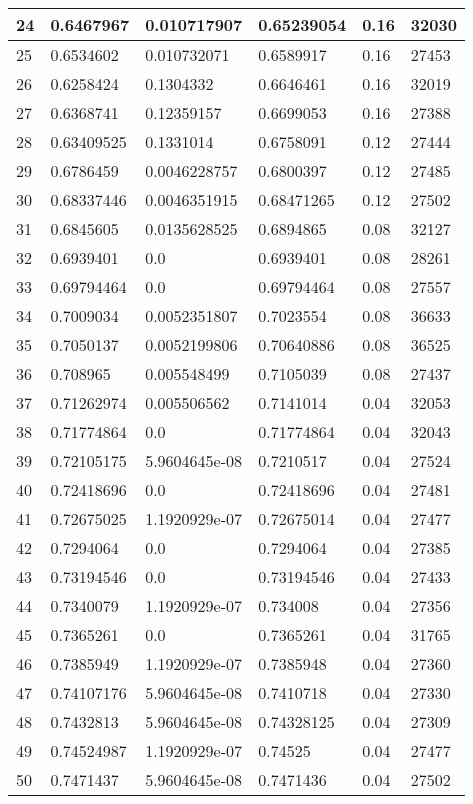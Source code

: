 \begin{longtable}{|l|l|l|l|l|l|}
24 & 0.6467967 & 0.010717907 & 0.65239054 & 0.16 & 32030 \\ \hline 
25 & 0.6534602 & 0.010732071 & 0.6589917 & 0.16 & 27453 \\ \hline 
26 & 0.6258424 & 0.1304332 & 0.6646461 & 0.16 & 32019 \\ \hline 
27 & 0.6368741 & 0.12359157 & 0.6699053 & 0.16 & 27388 \\ \hline 
28 & 0.63409525 & 0.1331014 & 0.6758091 & 0.12 & 27444 \\ \hline 
29 & 0.6786459 & 0.0046228757 & 0.6800397 & 0.12 & 27485 \\ \hline 
30 & 0.68337446 & 0.0046351915 & 0.68471265 & 0.12 & 27502 \\ \hline 
31 & 0.6845605 & 0.0135628525 & 0.6894865 & 0.08 & 32127 \\ \hline 
32 & 0.6939401 & 0.0 & 0.6939401 & 0.08 & 28261 \\ \hline 
33 & 0.69794464 & 0.0 & 0.69794464 & 0.08 & 27557 \\ \hline 
34 & 0.7009034 & 0.0052351807 & 0.7023554 & 0.08 & 36633 \\ \hline 
35 & 0.7050137 & 0.0052199806 & 0.70640886 & 0.08 & 36525 \\ \hline 
36 & 0.708965 & 0.005548499 & 0.7105039 & 0.08 & 27437 \\ \hline 
37 & 0.71262974 & 0.005506562 & 0.7141014 & 0.04 & 32053 \\ \hline 
38 & 0.71774864 & 0.0 & 0.71774864 & 0.04 & 32043 \\ \hline 
39 & 0.72105175 & 5.9604645e-08 & 0.7210517 & 0.04 & 27524 \\ \hline 
40 & 0.72418696 & 0.0 & 0.72418696 & 0.04 & 27481 \\ \hline 
41 & 0.72675025 & 1.1920929e-07 & 0.72675014 & 0.04 & 27477 \\ \hline 
42 & 0.7294064 & 0.0 & 0.7294064 & 0.04 & 27385 \\ \hline 
43 & 0.73194546 & 0.0 & 0.73194546 & 0.04 & 27433 \\ \hline 
44 & 0.7340079 & 1.1920929e-07 & 0.734008 & 0.04 & 27356 \\ \hline 
45 & 0.7365261 & 0.0 & 0.7365261 & 0.04 & 31765 \\ \hline 
46 & 0.7385949 & 1.1920929e-07 & 0.7385948 & 0.04 & 27360 \\ \hline 
47 & 0.74107176 & 5.9604645e-08 & 0.7410718 & 0.04 & 27330 \\ \hline 
48 & 0.7432813 & 5.9604645e-08 & 0.74328125 & 0.04 & 27309 \\ \hline 
49 & 0.74524987 & 1.1920929e-07 & 0.74525 & 0.04 & 27477 \\ \hline 
50 & 0.7471437 & 5.9604645e-08 & 0.7471436 & 0.04 & 27502 \\ \hline 
\end{longtable}